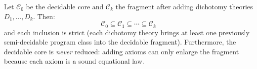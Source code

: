 \begin{proposition}
\label{prop:monotonic-decidability}
Let $\mathcal{C}_0$ be the decidable core and $\mathcal{C}_k$ the
fragment after adding dichotomy theories $D_1, \ldots, D_k$.  Then:
\[
  \mathcal{C}_0 \subseteq \mathcal{C}_1 \subseteq \cdots
    \subseteq \mathcal{C}_k
\]
and each inclusion is strict (each dichotomy theory brings at least
one previously semi-decidable program class into the decidable
fragment).  Furthermore, the decidable core is \emph{never}
reduced: adding axioms can only enlarge the fragment because each
axiom is a sound equational law.
\end{proposition}



